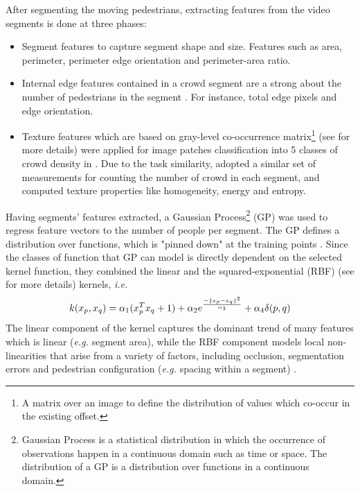 After segmenting the moving pedestrians, extracting features from the video segments is done at three phases:
\begin{itemize}
	\item Segment features to capture segment shape and size. Features such as area, perimeter, perimeter edge orientation and perimeter-area ratio. 
	\item Internal edge features contained in a crowd segment are a strong about the number of pedestrians in the segment \cite{kong2005counting}. For instance, total edge pixels and edge orientation. 
	\item Texture features which are based on gray-level co-occurrence matrix\footnote{A matrix over an image to define the distribution of values which co-occur in the existing offset.} (see  \cite{haralick1973textural} for more details) were applied for image patches classification into 5 classes of crowd density in \cite{marana1998efficacy}. Due to the task similarity, \citeauthor*{chan2008privacy} adopted a similar set of measurements for counting the number of crowd in each segment, and computed texture properties like homogeneity, energy and entropy. 
\end{itemize} 
Having segments' features extracted, a Gaussian Process\footnote{Gaussian Process is a statistical distribution in which the occurrence of observations happen in a continuous domain such as time or space. The distribution of a GP is a distribution over functions in a continuous domain.} (GP)  was used to regress feature vectors to the number of people per segment. The GP defines a distribution over functions, which is "pinned down" at the training points \cite{chan2008privacy}. Since the classes of function that GP can model is directly dependent on the selected kernel function, they combined the linear and the squared-exponential (RBF) (see \cite{shashua2009introduction} for more details) kernels, \textit{i.e.}
\begin{equation}
\centering k(x_p, x_q) = \alpha_1(x_p^{T}x_q+1) + \alpha_2e^{\frac{-\|x_p-x_q\|^2}{\alpha_3}} + \alpha_4\delta(p,q)     
\end{equation}
The linear component of the kernel captures the dominant trend of many features which is linear (\textit{e.g.} segment area), while the RBF component models local non-linearities that arise from a variety of factors, including occlusion, segmentation errors and pedestrian configuration (\textit{e.g.} spacing within a segment) \cite{chan2008privacy}. 
  

